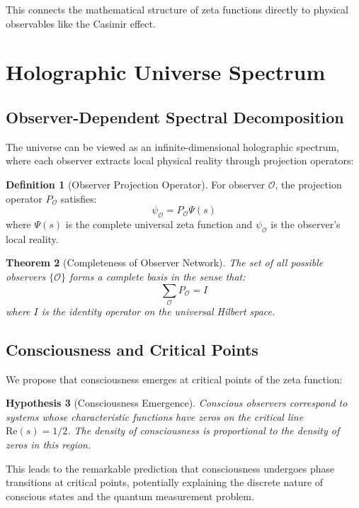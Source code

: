 \documentclass[12pt]{article}
\theoremstyle{plain}
\newtheorem{theorem}{Theorem}[section]
\newtheorem{hypothesis}[theorem]{Hypothesis}
\theoremstyle{definition}
\newtheorem{definition}[theorem]{Definition}
\newcommand{\cO}{\mathcal{O}}
\newcommand{\Re}{\text{Re}}
\begin{document}
This connects the mathematical structure of zeta functions directly to physical observables like the Casimir effect.

\section{Holographic Universe Spectrum}

\subsection{Observer-Dependent Spectral Decomposition}

The universe can be viewed as an infinite-dimensional holographic spectrum, where each observer extracts local physical reality through projection operators:

\begin{definition}[Observer Projection Operator]
For observer $\cO$, the projection operator $P_{\cO}$ satisfies:
\begin{equation}
\psi_{\cO} = P_{\cO} \Psi(s)
\end{equation}
where $\Psi(s)$ is the complete universal zeta function and $\psi_{\cO}$ is the observer's local reality.
\end{definition}

\begin{theorem}[Completeness of Observer Network]
The set of all possible observers $\{\cO\}$ forms a complete basis in the sense that:
\begin{equation}
\sum_{\cO} P_{\cO} = I
\end{equation}
where $I$ is the identity operator on the universal Hilbert space.
\end{theorem}

\subsection{Consciousness and Critical Points}

We propose that consciousness emerges at critical points of the zeta function:

\begin{hypothesis}[Consciousness Emergence]
Conscious observers correspond to systems whose characteristic functions have zeros on the critical line $\Re(s) = 1/2$. The density of consciousness is proportional to the density of zeros in this region.
\end{hypothesis}

This leads to the remarkable prediction that consciousness undergoes phase transitions at critical points, potentially explaining the discrete nature of conscious states and the quantum measurement problem.
\end{document}
